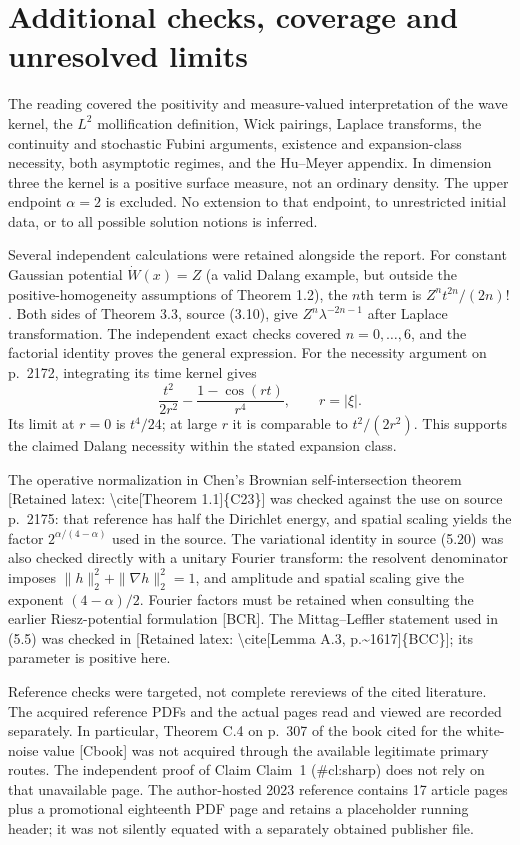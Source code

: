 \documentclass[10pt]{article}
\begin{document}
\section*{Additional checks, coverage and unresolved limits}
The reading covered the positivity and measure-valued interpretation of the wave kernel, the \(L^2\) mollification definition, Wick pairings, Laplace transforms, the continuity and stochastic Fubini arguments, existence and expansion-class necessity, both asymptotic regimes, and the Hu–Meyer appendix. In dimension three the kernel is a positive surface measure, not an ordinary density. The upper endpoint \(\alpha=2\) is excluded. No extension to that endpoint, to unrestricted initial data, or to all possible solution notions is inferred.\par
Several independent calculations were retained alongside the report. For constant Gaussian potential \(\dot W(x)=Z\) (a valid Dalang example, but outside the positive-homogeneity assumptions of Theorem 1.2), the \(n\)th term is \(Z^nt^{2n}/(2n)!\). Both sides of Theorem 3.3, source (3.10), give \(Z^n\lambda^{-2n-1}\) after Laplace transformation. The independent exact checks covered \(n=0,\ldots,6\), and the factorial identity proves the general expression. For the necessity argument on p. 2172, integrating its time kernel gives \[\frac{t^2}{2r^2}-\frac{1-\cos(rt)}{r^4},\qquad r=|\xi|.\] Its limit at \(r=0\) is \(t^4/24\); at large \(r\) it is comparable to \(t^2/(2r^2)\). This supports the claimed Dalang necessity within the stated expansion class.\par
The operative normalization in Chen’s Brownian self-intersection theorem [Retained latex: \textbackslash{}cite[Theorem 1.1]\{C23\}] was checked against the use on source p. 2175: that reference has half the Dirichlet energy, and spatial scaling yields the factor \(2^{\alpha/(4-\alpha)}\) used in the source. The variational identity in source (5.20) was also checked directly with a unitary Fourier transform: the resolvent denominator imposes \(\|h\|_2^2+\|\nabla h\|_2^2=1\), and amplitude and spatial scaling give the exponent \((4-\alpha)/2\). Fourier factors must be retained when consulting the earlier Riesz-potential formulation [BCR]. The Mittag–Leffler statement used in (5.5) was checked in [Retained latex: \textbackslash{}cite[Lemma A.3, p.\textasciitilde{}1617]\{BCC\}]; its parameter is positive here.\par
Reference checks were targeted, not complete rereviews of the cited literature. The acquired reference PDFs and the actual pages read and viewed are recorded separately. In particular, Theorem C.4 on p. 307 of the book cited for the white-noise value [Cbook] was not acquired through the available legitimate primary routes. The independent proof of Claim Claim 1 (\#cl:sharp) does not rely on that unavailable page. The author-hosted 2023 reference contains 17 article pages plus a promotional eighteenth PDF page and retains a placeholder running header; it was not silently equated with a separately obtained publisher file.\par
\end{document}
